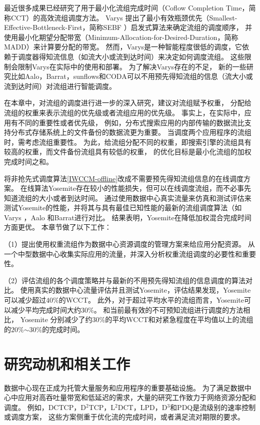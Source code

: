  最近很多成果已经研究了用于最小化流组完成时间（Coflow Completion Time，简称CCT）的高效流组调度方法。
 Varys \cite{chowdhury2014efficient}提出了最小有效瓶颈优先（Smallest- Effective-Bottleneck-First，简称SEBF ）启发式算法来确定流组的调度顺序，
 并使用最小化期望分配带宽（Minimum-Allocation-for-Desired-Duration，简称MADD）来计算要分配的带宽。
然而，Varys是一种智能程度很低的调度，它依赖于调度器得知流信息（如流大小或流到达时间）来决定如何调度流组。
这些限制会限制Varys在实际中的使用和部署。
为了解决Varys存在的不足，
新的一些研究比如Aalo\cite{chowdhury2015efficient}，Barrat\cite{dogar2014decentralized}，sunflows\cite{huang2016sunflow}和CODA\cite{zhang2016coda}可以不用预先得知流组的信息（流大小或流到达时间）对流组进行智能调度。
 
在本章中，对流组的调度进行进一步的深入研究，建议对流组赋予权重，
分配给流组的权重来表示流组的优先级或者流组应用的优先级。
事实上，在实际中，应用有不同的重要性或者优先级，
例如，分布式搜索应用的内部传输的数据流比支持分布式存储系统上的文件备份的数据流更为重要。
当调度两个应用程序的流组时，需考虑流组重要性。
为此，给流组分配不同的权重，即搜索引擎的流组具有较高的权重，而文件备份流组具有较低的权重，
的优化目标是最小化流组的加权完成时间之和。

将非抢先式调度算法\ref{IWCCM-offline}改成不需要预先得知流组信息的在线调度方案。
在线算法Yosemite存在较小的性能损失，但可以在线调度流组，而不必事先知道流组的大小或者到达时间。
通过使用数据中心真实流量来仿真和测试评估来测试Yosemite的性能，并将其与具有最佳已知性能的最新的流组调度算法（如Varys \cite{chowdhury2014efficient}，Aalo \cite{chowdhury2015efficient}和Barrat\cite{dogar2014decentralized}进行对比。
结果表明，Yosemite在降低加权混合完成时间方面更优。
本章节做了以下工作：

（1）提出使用权重流组作为数据中心资源调度的管理方案来给应用分配资源。
从一个中型数据中心收集实际应用的流量，并深入分析权重流组调度的必要性和重要性。


（2）评估流组的各个调度策略并与最新的不用预先得知流组的信息调度的算法对比。
使用真实的数据中心流量评估并且测试Yosemite，评估结果发现，Yosemite可以减少超过$40\%$的WCCT。
此外，对于超过平均水平的流组而言，Yosemite可以减少平均完成时间大约$30\%$。
和当前最有效的不可预知流组进行调度的方法相比，
Yosemite 分别减少了约$30\%$的平均WCCT和对紧急程度在平均值以上的流组的$20\%$$\sim$$30\%$的完成时间。

\section{研究动机和相关工作}\label{Yosemite-motivation}
数据中心现在正成为托管大量服务和应用程序的重要基础设施。
为了满足数据中心中应用对高吞吐量带宽和低延迟的需求，大量的研究工作致力于网络资源分配和调度。
例如，DCTCP\cite{DCTCP}，D$^2$TCP\cite{D2TCP}，L$^2$DCT\cite{L2DCT}，LPD\cite{LPD}，D$^3$\cite{D3}和PDQ是流级别的速率控制或调度方案，
这些方案侧重于优化流的完成时间，或者满足流对期限的要求。

